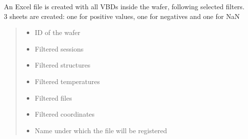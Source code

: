 \documentclass[letterpaper,10pt,english]{sphinxmanual}
\begin{document}

\begin{fulllineitems}
\label{\detokenize{excel:excel.excel_VBD}}
\pysigstartsignatures
{}
\pysigstopsignatures
\sphinxAtStartPar
An Excel file is created with all VBDs inside the wafer, following selected filters.
3 sheets are created: one for positive values, one for negatives and one for NaN
\begin{quote}\begin{description}
\begin{itemize}
\item {} 
\sphinxAtStartPar
{} \textendash{} ID of the wafer

\item {} 
\sphinxAtStartPar
{} \textendash{} Filtered sessions

\item {} 
\sphinxAtStartPar
{} \textendash{} Filtered structures

\item {} 
\sphinxAtStartPar
{} \textendash{} Filtered temperatures

\item {} 
\sphinxAtStartPar
{} \textendash{} Filtered files

\item {} 
\sphinxAtStartPar
{} \textendash{} Filtered coordinates

\item {} 
\sphinxAtStartPar
{} \textendash{} Name under which the file will be registered

\end{itemize}

\end{description}\end{quote}

\end{fulllineitems}
\end{document}
